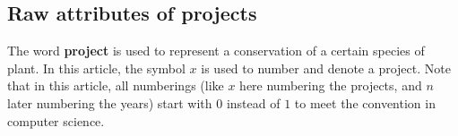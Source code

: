 \documentclass{article}
\begin{document}
\begin{comment}
$$(u_p \in A_p,(p=1,2,\cdots,n-1))$$

Through this recursion formula, we can find $F_n$ in terms of $F_1$:

\begin{equation}
\begin{split}
	F_n&=F_{n-2}-\sum_{i=1}^{n-2} \sum_{u_i} E_{u_i}^{(n-2)-i+1}-\sum_{i=1}^{n-1} \sum_{u_i} E_{u_i}^{(n-1)-i+1}+\alpha+\alpha=F_{n-3}-\cdots+3\alpha\\
	&=F_1-\sum_{j=1}^{n-1} \sum_{i=1}^{j}\sum_{u_i} E_{u_i}^{j-i+1}+(n-1)\alpha=k+\sum_{j=1}^{n-1} {\sum_{i=1}^{j} \sum_{u_i} E_{u_i}^{j-i+1}+n\alpha},
\end{split}
\end{equation}
where $u_p \in A_p$, and $p=1,2,\cdots,n-1)$.

Therefore, by using $(1)$, we can get a series of constraints:

$$F_P>C_p,(p=1,2,\cdots,n)$$
\begin{equation}
k+\sum_{j=1}^{p-1} {\sum_{i=1}^j}{\sum_{u_i}}E_{u_i}^{p-i+1}+p\alpha>\sum_{i=1}^p {\sum_{u_i} E_{u_i}^{p-i+1}},(p=1,2,\cdots,n)
\end{equation}
\begin{equation}
k+\sum_{j=1}^{p-1} {\sum_{i=1}^j}{\sum_{u_i}}E_{u_i}^{p-i+1}+p\frac{\sigma}{I}>\sum_{i=1}^p {\sum_{u_i} E_{u_i}^{p-i+1}},(p=1,2,\cdots,n)
\end{equation}

\par Under these constraints, in order to give the best plan for plant conservation, we need to find the greatest value of $\zeta$ $(9)$:
\begin{equation}
	\zeta = \frac{\sum_x (B_x \cdot U_x \cdot _{S_x})}{(\sum_x \sum_{v=1}^{T_x})\cdot I},(x \in {Q_i} \subset Z=\bigcup\limits_{t=1}^{n} A_t)
\end{equation}
\end{comment}

\subsection{Raw attributes of projects}

The word \textbf{project} is used to represent a conservation of a certain species of plant.
In this article, the symbol $x$ is used to number and denote a project.
Note that in this article, all numberings
(like $x$ here numbering the projects, and $n$ later numbering the years)
start with $0$ instead of $1$ to meet the convention in computer science.
\end{document}
